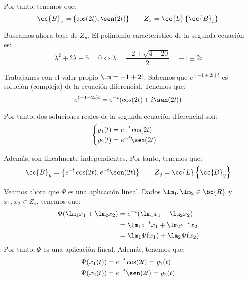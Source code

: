 \documentclass[12pt]{article}
\begin{document}
\begin{ejercicio}
        Por tanto, tenemos que:
        \begin{equation*}
            \cc{B}_x=\left\{\cos(2t),\sen(2t)\right\}
            \qquad
            Z_x=\cc{L}\left\{\cc{B}_x\right\}
        \end{equation*}

        Buscamos ahora base de $Z_y$. El polinomio característico de la segunda ecuación es:
        \begin{equation*}
            \lambda^2+2\lambda+5=0\Longleftrightarrow
            \lambda=\dfrac{-2\pm\sqrt{4-20}}{2}=-1\pm 2i
        \end{equation*}

        Trabajamos con el valor propio $\lm=-1+2i$. Sabemos que $e^{(-1+2i)t}$ es solución (compleja) de la ecuación diferencial.
        Tenemos que:
        \begin{equation*}
            e^{(-1+2i)t}=e^{-t}(\cos(2t)+i\sen(2t))
        \end{equation*}

        Por tanto, dos soluciones reales de la segunda ecuación diferencial son:
        \begin{equation*}
            \begin{cases}
                y_1(t)=e^{-t}\cos(2t)\\
                y_2(t)=e^{-t}\sen(2t)
            \end{cases}
        \end{equation*}

        Además, son linealmente independientes. Por tanto, tenemos que:
        \begin{equation*}
            \cc{B}_y=\left\{e^{-t}\cos(2t),e^{-t}\sen(2t)\right\}
            \qquad
            Z_y=\cc{L}\left\{\cc{B}_y\right\}
        \end{equation*}

        Veamos ahora que $\Psi$ es una aplicación lineal. Dados $\lm_1,\lm_2\in \bb{R}$ y $x_1,x_2\in Z_x$, tenemos que:
        \begin{align*}
            \Psi(\lm_1x_1+\lm_2x_2)&=e^{-t}(\lm_1x_1+\lm_2x_2)\\
            &=\lm_1e^{-t}x_1+\lm_2e^{-t}x_2\\
            &=\lm_1\Psi(x_1)+\lm_2\Psi(x_2)
        \end{align*}
        Por tanto, $\Psi$ es una aplicación lineal. Además, tenemos que:
        \begin{align*}
            \Psi(x_1(t))&=e^{-t}\cos(2t)=y_1(t)\\
            \Psi(x_2(t))&=e^{-t}\sen(2t)=y_2(t)
        \end{align*}


\end{ejercicio}
\end{document}
